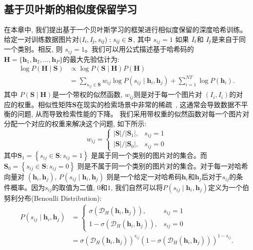 \subsection{基于贝叶斯的相似度保留学习}
在本章中, 我们提出基于一个贝叶斯学习的框架进行相似度保留的深度哈希训练。给定一对训练数据图片对$(\it{I}_i,\it{I}_j,s_{ij}): s_{ij} \in \textbf{S}$, 其中 $s_{ij} =1 $ 如果 $\it{I}_i$和 $\it{I}_j$是来自于同一个类别。相反, 则 $s_{ij} =1 $。我们可以用公式描述基于哈希码的$\boldsymbol{H} = \{ \mathbf{h}_1, \mathbf{h}_2,...,\mathbf{h}_P\}$的最大先验估计为:
\begin{equation}
    \begin{aligned}
    \log P(\boldsymbol{H} \mid \mathbf{S}) & \propto \log P(\mathbf{S} \mid \boldsymbol{H}) P(\boldsymbol{H}) \\
    &=\sum_{s_{i j} \in \mathbf{S}} w_{i j} \log P\left(s_{i j} \mid \boldsymbol{h}_{i}, \boldsymbol{h}_{j}\right)+\sum_{i=1}^{NT} \log P\left(\boldsymbol{h}_{i}\right).
    \end{aligned}
    \label{eq:map}
\end{equation}
其中 $P(\mathbf{S} \mid \boldsymbol{H})$是一个带权的似然函数, $w_{ij}$则是对于每一个图片对 $(I_i,I_i)$的对应的权重。相似性矩阵$\mathbf{S}$在现实的检索场景中非常的稀疏~\cite{cao2017hashnet}, 这通常会导致数据不平衡的问题, 从而导致检索性能的下降。 我们采用带权重的似然函数对每一个图片对分配一个对应的权重来解决这个问题, 如下所示:
\begin{equation}
    w_{i j}=\left\{\begin{array}{ll}
|\mathbf{S}| /\left|\mathbf{S}_{1}\right|, & s_{i j}=1 \\
|\mathbf{S}| /\left|\mathbf{S}_{0}\right|, & s_{i j}=0
\end{array}\right.
\end{equation}
其中$\mathbf{S}_{1}=\left\{s_{i j} \in \mathbf{S}: s_{i j}=1\right\}$ 是属于同一个类别的图片对的集合。而$\mathbf{S}_{0}=\left\{s_{i j} \in \mathbf{S}: s_{i j}=0\right\}$ 则是不属于同一个类别的图片对的集合。对于每一对哈希向量对 $(\mathbf{h}_i,\mathbf{h}_j)$, $P\left(s_{i j} \mid \boldsymbol{h}_{i}, \boldsymbol{h}_{j}\right)$ 则是一个给定一对哈希码$\mathbf{h}_i$和$\mathbf{h}_j$后对于$s_{ij}$的条件概率。因为$s_{ij}$的取值为二值, $0$和$1$, 我们自然可以将$P\left(s_{i j} \mid \boldsymbol{h}_{i}, \boldsymbol{h}_{j}\right)$定义为一个伯努利分布(Benoulli Distribution):
\begin{equation}
    \begin{aligned}
P\left(s_{i j} \mid \boldsymbol{h}_{i}, \boldsymbol{h}_{j}\right) &=\left\{\begin{array}{ll}
\sigma\left(\mathcal{D}_H\left(\boldsymbol{h}_{i}, \boldsymbol{h}_{j}\right)\right), & s_{i j}=1 \\
1-\sigma\left(\mathcal{D}_H\left(\boldsymbol{h}_{i}, \boldsymbol{h}_{j}\right)\right), & s_{i j}=0
\end{array}\right.\\
&=\sigma\left(\mathcal{D}_H\left(\boldsymbol{h}_{i}, \boldsymbol{h}_{j}\right)\right)^{s_{i j}}\left(1-\sigma\left(\mathcal{D}_H\left(\boldsymbol{h}_{i}, \boldsymbol{h}_{j}\right)\right)\right)^{1-s_{i j}}.
\end{aligned}
\label{eq:beyesian}
\end{equation}
